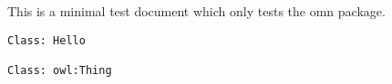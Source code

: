 \documentclass[pdftex]{article}
\begin{document}
This is a minimal test document which only tests the omn package.

\begin{lstlisting}[language=omn]
Class: Hello

Class: owl:Thing
\end{lstlisting}
\end{document}
